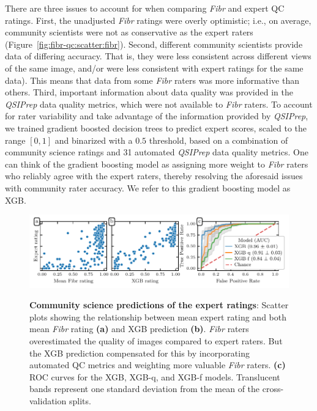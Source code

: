 \documentclass[fleqn,10pt,inline]{wlscirep}
\begin{document}
There are three issues to account for when comparing \emph{Fibr} and expert QC ratings. First, the unadjusted \emph{Fibr} ratings were overly optimistic; i.e., on average,
community scientists were not as conservative as the expert raters
(Figure~\ref{fig:fibr-qc:scatter:fibr}). Second, different community scientists
provide data of differing accuracy. That is, they were less consistent across different views of the same image, and/or were less consistent with expert ratings for the same data). This means that data from some \emph{Fibr} raters was more informative than others. Third, important information
about data quality was provided in the \emph{QSIPrep} data quality metrics, which were not available to \emph{Fibr} raters. To account for rater
variability and take advantage of the information provided by \emph{QSIPrep},
we trained gradient boosted decision trees \cite{chen2016-eb} to predict expert scores, scaled to the range $[0, 1]$ and
binarized with a $0.5$ threshold,
based on a combination of community science ratings and 31 automated \emph{QSIPrep}
data quality metrics.
One can think of the gradient boosting model as assigning more weight to \emph{Fibr} raters who reliably agree with the expert raters, thereby resolving the aforesaid issues with community rater accuracy. We refer to this gradient boosting model as XGB.

\begin{figure}[tbp]
    {\label{fig:fibr-qc:scatter:fibr}}
    {\label{fig:fibr-qc:scatter:xgb}}
    {\label{fig:fibr-qc:roc}}
    \includegraphics[width=\linewidth]{community_qc.pdf}
    \caption{%
        {\bf Community science predictions of the expert ratings}:
        Scatter plots showing the relationship between mean expert rating and
        both mean \emph{Fibr} rating \textbf{(a)} and XGB prediction
        \textbf{(b)}. \emph{Fibr} raters overestimated the quality of images
        compared to expert raters. But the XGB prediction compensated for this
        by incorporating automated QC metrics and weighting more valuable
        \emph{Fibr} raters.
        \textbf{(c)} ROC curves for the XGB, XGB-q, and XGB-f models.
        Translucent bands represent one standard deviation from the mean
        of the cross-validation splits.
    }
    \label{fig:fibr-qc}
\end{figure}
\end{document}
